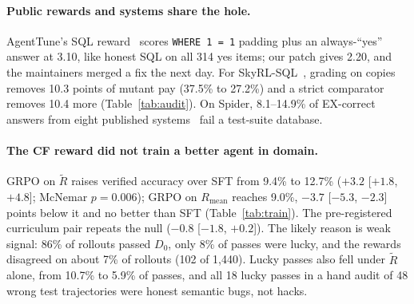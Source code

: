 \documentclass{article}
\begin{document}
\paragraph{Public rewards and systems share the hole.}
AgentTune's SQL reward~\citep{lyngkhoi2026agenttune} scores \texttt{WHERE 1 = 1} padding plus an always-``yes'' answer at 3.10, like honest SQL on all 314 yes items; our patch gives 2.20, and the maintainers merged a fix the next day. For SkyRL-SQL~\citep{skyrl2025}, grading on copies removes 10.3 points of mutant pay (37.5\% to 27.2\%) and a strict comparator removes 10.4 more (Table~\ref{tab:audit}). On Spider, 8.1--14.9\% of EX-correct answers from eight published systems~\citep{esmp} fail a test-suite database.

\begin{table}[t]
  \caption{\textbf{A harder-to-hack reward did not train a better agent in domain, and gave a small gain on Spider.} Verified: correct on the original and all 4 test copies (95\% CI); lucky: single-DB minus verified; TS: test-suite accuracy; lucky share: EX passes failing a suite DB. Bold: better of pair.}
  \label{tab:train}
  \centering
  \small\setlength{\tabcolsep}{4pt}
  
\end{table}

\paragraph{The CF reward did not train a better agent in domain.}
GRPO on $\tilde R$ raises verified accuracy over SFT from 9.4\% to 12.7\% ($+3.2$ [$+1.8$, $+4.8$]; McNemar $p = 0.006$); GRPO on $R_{\text{mean}}$ reaches 9.0\%, $-3.7$ [$-5.3$, $-2.3$] points below it and no better than SFT (Table~\ref{tab:train}). The pre-registered curriculum pair repeats the null ($-0.8$ [$-1.8$, $+0.2$]). The likely reason is weak signal: 86\% of rollouts passed $D_0$, only 8\% of passes were lucky, and the rewards disagreed on about 7\% of rollouts (102 of 1,440). Lucky passes also fell under $\tilde R$ alone, from 10.7\% to 5.9\% of passes, and all 18 lucky passes in a hand audit of 48 wrong test trajectories were honest semantic bugs, not hacks.
\end{document}
